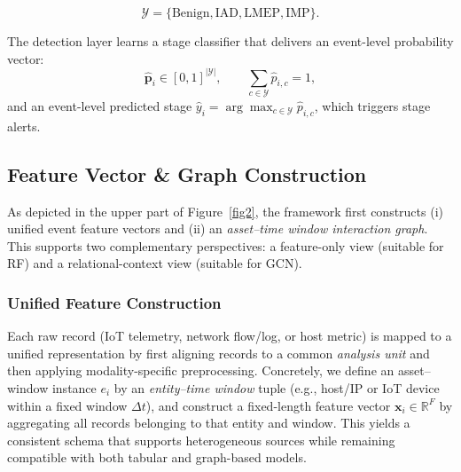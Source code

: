 \documentclass[pdflatex,sn-mathphys-num]{sn-jnl}
\theoremstyle{thmstyleone}%
\theoremstyle{thmstyletwo}%
\theoremstyle{thmstylethree}%
\begin{document}
\begin{equation}
\mathcal{Y}=\{\text{Benign}, \text{IAD}, \text{LMEP}, \text{IMP}\}.
\end{equation}

The detection layer learns a stage classifier that delivers an event-level probability vector:
\begin{equation}
\hat{\mathbf{p}}_i \in [0,1]^{|\mathcal{Y}|}, \qquad \sum_{c\in\mathcal{Y}}\hat{p}_{i,c}=1,
\end{equation}
and an event-level predicted stage $\hat{y}_i=\arg\max_{c\in\mathcal{Y}}\hat{p}_{i,c}$, which triggers stage alerts.

\subsection{Feature Vector \& Graph Construction}
\label{sec:framework_construction}

As depicted in the upper part of Figure~\ref{fig2}, the framework first constructs (i) unified event feature vectors and (ii) an \emph{asset--time window interaction graph}. This supports two complementary perspectives: a feature-only view (suitable for RF) and a relational-context view (suitable for GCN).

\subsubsection{Unified Feature Construction}
\label{sec:framework_features}
Each raw record (IoT telemetry, network flow/log, or host metric) is mapped to a unified representation by first aligning records to a common \emph{analysis unit} and then applying modality-specific preprocessing. Concretely, we define an asset–window instance $e_i$ by an \emph{entity--time window} tuple (e.g., host/IP or IoT device within a fixed window $\Delta t$), and construct a fixed-length feature vector $\mathbf{x}_i \in \mathbb{R}^{F}$ by aggregating all records belonging to that entity and window. This yields a consistent schema that supports heterogeneous sources while remaining compatible with both tabular and graph-based models.
\end{document}
